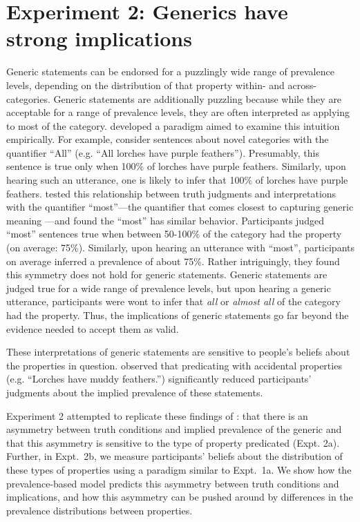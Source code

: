 \documentclass[10pt,letterpaper]{article}
\begin{document}
\section{Experiment 2: Generics have strong implications}

Generic statements can be endorsed for a puzzlingly wide range of prevalence levels, depending on the distribution of that property within- and across- categories. Generic statements are additionally puzzling because while they are acceptable for a range of prevalence levels, they are often interpreted as applying to most of the category.   developed a paradigm aimed to examine this intuition empirically. For example, consider sentences about novel categories with the quantifier ``All'' (e.g. ``All lorches have purple feathers''). Presumably, this sentence is true only when 100\% of lorches have purple feathers. Similarly, upon hearing such an utterance, one is likely to infer that 100\% of lorches have purple feathers.   tested this relationship between truth judgments and interpretations with the quantifier ``most''---the quantifier that comes closest to capturing generic meaning \cite{Carlson1977,Cimpian2010b}---and found the ``most'' has similar behavior. Participants judged ``most'' sentences true when between 50-100\% of the category had the property (on average: 75\%). Similarly, upon hearing an utterance with ``most'', participants on average inferred a prevalence of about 75\%. Rather intriguingly, they found this symmetry does not hold for generic statements. Generic statements are judged true for a wide range of prevalence levels, but upon hearing a generic utterance, participants were wont to infer that \emph{all} or \emph{almost all} of the category had the property. Thus, the implications of generic statements go far beyond the evidence needed to accept them as valid.

These interpretations of generic statements are sensitive to people's beliefs about the properties in question.  observed that predicating with accidental properties (e.g. ``Lorches have muddy feathers.'') significantly reduced participants' judgments about the implied prevalence of these statements.



Experiment 2 attempted to replicate these findings of : that there is an asymmetry between truth conditions and implied prevalence of the generic and that this asymmetry is sensitive to the type of property predicated (Expt. 2a). Further, in Expt.~2b, we measure participants' beliefs about the distribution of these types of properties using a paradigm similar to Expt.~1a. We show how the prevalence-based model predicts this asymmetry between truth conditions and implications, and how this asymmetry can be pushed around by differences in the prevalence distributions between properties.
\end{document}
